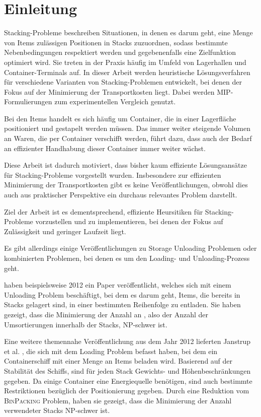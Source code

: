 \section{Einleitung}
\label{sec:einleitung}

Stacking-Probleme beschreiben Situationen, in denen es darum geht, eine Menge von Items zulässigen Positionen in Stacks zuzuordnen, sodass bestimmte Nebenbedingungen respektiert werden und gegebenenfalls eine Zielfunktion optimiert wird. Sie treten in der Praxis häufig im Umfeld von Lagerhallen und Container-Terminals auf. In dieser Arbeit werden heuristische Lösungsverfahren für verschiedene Varianten von Stacking-Problemen entwickelt, bei denen der Fokus auf der Minimierung der Transportkosten liegt. Dabei werden MIP-Formulierungen zum experimentellen Vergleich genutzt.\newline

Bei den Items handelt es sich häufig um Container, die in einer Lagerfläche positioniert und gestapelt werden müssen. Das immer weiter steigende Volumen an Waren, die per Container verschifft werden, führt dazu, dass auch der Bedarf an effizienter Handhabung dieser Container immer weiter wächst.

Diese Arbeit ist dadurch motiviert, dass bisher kaum effiziente Lösungsansätze für Stacking-Probleme vorgestellt wurden. Insbesondere zur effizienten Minimierung der Transportkosten gibt es keine Veröffentlichungen, obwohl dies auch aus praktischer Perspektive ein durchaus relevantes Problem darstellt.\newline

Ziel der Arbeit ist es dementsprechend, effiziente Heursitiken für Stacking-Probleme vorzustellen und zu implementieren, bei denen der Fokus auf Zulässigkeit und geringer Laufzeit liegt.

Es gibt allerdings einige Veröffentlichungen zu Storage Unloading Problemen oder kombinierten Problemen,
bei denen es um den Loading- und Unloading-Prozess geht.

\textcite{Caserta2012} haben beispielsweise 2012 ein Paper veröffentlicht, welches sich mit
einem Unloading Problem beschäftigt, bei dem es darum geht, Items, die bereits in Stacks gelagert sind,
in einer bestimmten Reihenfolge zu entladen. Sie haben gezeigt, dass die Minimierung der Anzahl
an , also der Anzahl der Umsortierungen innerhalb der Stacks, NP-schwer ist.

Eine weitere themennahe Veröffentlichung aus dem Jahr 2012 lieferten Janstrup et al. \cite{Delgado2012},
die sich mit dem Loading Problem befasst haben, bei dem ein Containerschiff mit einer Menge an Items beladen wird.
Basierend auf der Stabilität des Schiffs, sind für jeden Stack Gewichts- und Höhenbeschränkungen gegeben.
Da einige Container eine Energiequelle benötigen, sind auch bestimmte Restriktionen bezüglich der Positionierung gegeben.
Durch eine Reduktion vom \textsc{BinPacking} Problem, haben sie gezeigt, dass die Minimierung der Anzahl
verwendeter Stacks NP-schwer ist.

